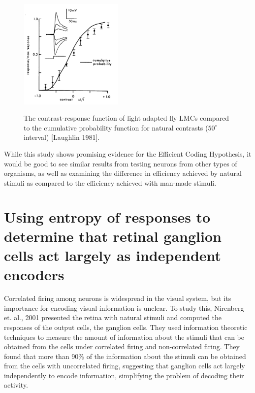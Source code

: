 \documentclass[twoside]{article}
\begin{document}
\begin{multicols}{2}
\begin{figure}[H]
	\caption{
		The contrast-response function of light adapted fly LMCs compared to the cumulative probability function for natural contrasts ($50^\circ$ interval) [Laughlin 1981].
	}
	\includegraphics[width=0.45\textwidth]{laughlin1981-fig2}
	\label{fig:laughlin1981-fig2}
\end{figure}

While this study shows promising evidence for the Efficient Coding Hypothesis, it would be good to see similar results from testing neurons from other types of organisms, as well as examining the difference in efficiency achieved by natural stimuli as compared to the efficiency achieved with man-made stimuli.




\section{Using entropy of responses to determine that retinal ganglion cells act largely as independent encoders}

Correlated firing among neurons is widespread in the visual system, but its importance for encoding visual information is unclear. To study this, Nirenberg et. al., 2001 presented the retina with natural stimuli and computed the responses of the output cells, the ganglion cells. They used information theoretic techniques to measure the amount of information about the stimuli that can be obtained from the cells under correlated firing and non-correlated firing. They found that more than 90\% of the information about the stimuli can be obtained from the cells with uncorrelated firing, suggesting that ganglion cells act largely independently to encode information, simplifying the problem of decoding their activity. 


\end{multicols}
\end{document}
